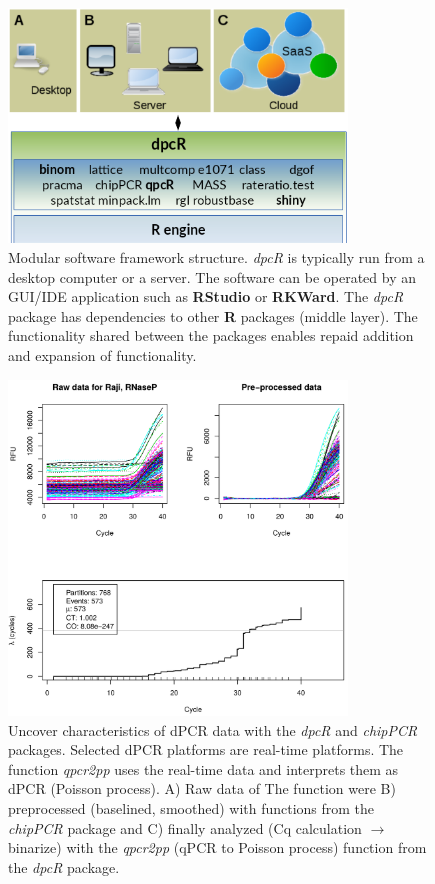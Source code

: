 \documentclass[a4,center,fleqn]{NAR}
\begin{document}
\begin{figure}[t]
\begin{center}
\includegraphics[width=9cm]{dpcR_implementation_1.png}
\end{center}
\caption{Modular software framework structure. \textit{dpcR} is typically run from a 
desktop computer or a server. The software can be operated by an GUI/IDE 
application such as \textbf{RStudio} or \textbf{RKWard}. The \textit{dpcR} 
package has dependencies to other \textbf{R} packages (middle layer). The 
functionality shared between the packages enables repaid addition and expansion 
of functionality.} 
\label{dpcR_implementation_1}
\end{figure}

\begin{figure}[t]
\begin{center}
\includegraphics[width=9cm]{qpcr2pp_1.png}
\end{center}
\caption{Uncover characteristics of dPCR data with the \textit{dpcR} and \textit{chipPCR} packages. 
Selected dPCR platforms are real-time platforms. The function \textit{qpcr2pp} uses the 
real-time data and interprets them as dPCR (Poisson process). A) Raw data of The 
function were B) preprocessed (baselined, smoothed) with functions from the 
\textit{chipPCR} package and C) finally analyzed (Cq calculation $\rightarrow$ binarize) with the 
\textit{qpcr2pp} (qPCR to Poisson process) function from the \textit{dpcR} package.} 
\label{dpcR_implementation_1}
\end{figure}
\end{document}
